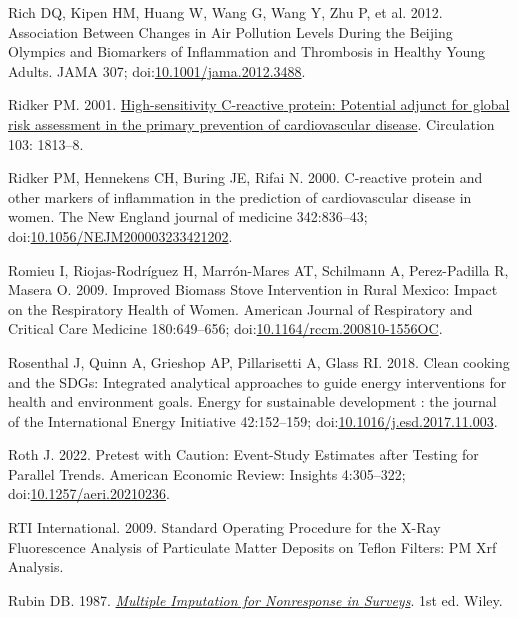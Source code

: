 \documentclass[
  letterpaper,
  DIV=11,
  numbers=noendperiod]{scrartcl}
\newlength{\cslhangindent}
\newenvironment{CSLReferences}[2] %
 {\begin{list}{}{%
  \setlength{\itemindent}{0pt}
  \setlength{\leftmargin}{0pt}
  \setlength{\parsep}{0pt}
  \ifodd #1
   \setlength{\leftmargin}{\cslhangindent}
   \setlength{\itemindent}{-1\cslhangindent}
  \fi
  \setlength{\itemsep}{#2\baselineskip}}}
 {\end{list}}
\begin{document}
\begin{CSLReferences}{1}{1}
Rich DQ, Kipen HM, Huang W, Wang G, Wang Y, Zhu P, et al. 2012.
Association {Between Changes} in {Air Pollution Levels During} the
{Beijing Olympics} and {Biomarkers} of {Inflammation} and {Thrombosis}
in {Healthy Young Adults}. JAMA 307;
doi:\href{https://doi.org/10.1001/jama.2012.3488}{10.1001/jama.2012.3488}.

Ridker PM. 2001.
\href{https://www.ncbi.nlm.nih.gov/pubmed/11282915}{High-sensitivity
{C-reactive} protein: Potential adjunct for global risk assessment in
the primary prevention of cardiovascular disease}. Circulation 103:
1813--8.

Ridker PM, Hennekens CH, Buring JE, Rifai N. 2000. C-reactive protein
and other markers of inflammation in the prediction of cardiovascular
disease in women. The New England journal of medicine 342:836--43;
doi:\href{https://doi.org/10.1056/NEJM200003233421202}{10.1056/NEJM200003233421202}.

Romieu I, Riojas-Rodríguez H, Marrón-Mares AT, Schilmann A,
Perez-Padilla R, Masera O. 2009. Improved {Biomass Stove Intervention}
in {Rural Mexico}: {Impact} on the {Respiratory Health} of {Women}.
American Journal of Respiratory and Critical Care Medicine 180:649--656;
doi:\href{https://doi.org/10.1164/rccm.200810-1556OC}{10.1164/rccm.200810-1556OC}.

Rosenthal J, Quinn A, Grieshop AP, Pillarisetti A, Glass RI. 2018. Clean
cooking and the {SDGs}: {Integrated} analytical approaches to guide
energy interventions for health and environment goals. Energy for
sustainable development : the journal of the International Energy
Initiative 42:152--159;
doi:\href{https://doi.org/10.1016/j.esd.2017.11.003}{10.1016/j.esd.2017.11.003}.

Roth J. 2022. Pretest with {Caution}: {Event-Study Estimates} after
{Testing} for {Parallel Trends}. American Economic Review: Insights
4:305--322;
doi:\href{https://doi.org/10.1257/aeri.20210236}{10.1257/aeri.20210236}.

RTI International. 2009. Standard {Operating Procedure} for the {X-Ray
Fluorescence Analysis} of {Particulate Matter Deposits} on {Teflon
Filters}: {PM Xrf Analysis}.

Rubin DB. 1987.
\emph{\href{https://doi.org/10.1002/9780470316696}{Multiple {Imputation}
for {Nonresponse} in {Surveys}}}. 1st ed. Wiley.


\end{CSLReferences}
\end{document}

